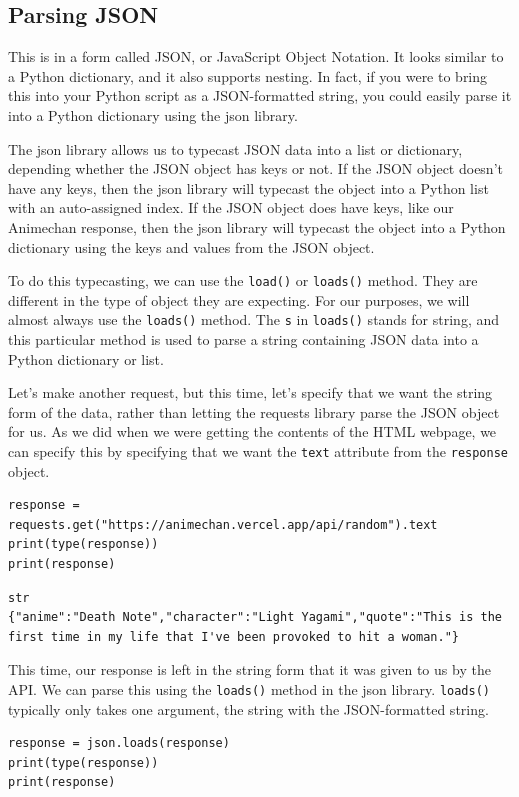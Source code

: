 \subsection{Parsing JSON}
This is in a form called JSON, or JavaScript Object Notation. It looks similar to a Python dictionary, and it also supports nesting. In fact, if you were to bring this into your Python script as a JSON-formatted string, you could easily parse it into a Python dictionary using the json library.\par
The json library allows us to typecast JSON data into a list or dictionary, depending whether the JSON object has keys or not. If the JSON object doesn't have any keys, then the json library will typecast the object into a Python list with an auto-assigned index. If the JSON object does have keys, like our Animechan response, then the json library will typecast the object into a Python dictionary using the keys and values from the JSON object.\par
To do this typecasting, we can use the \verb|load()| or \verb|loads()| method. They are different in the type of object they are expecting. For our purposes, we will almost always use the \verb|loads()| method. The \verb|s| in \verb|loads()| stands for string, and this particular method is used to parse a string containing JSON data into a Python dictionary or list.\par
Let's make another request, but this time, let's specify that we want the string form of the data, rather than letting the requests library parse the JSON object for us. As we did when we were getting the contents of the HTML webpage, we can specify this by specifying that we want the \verb|text| attribute from the \verb|response| object.
\begin{lstlisting}[style=pippython]
response = requests.get("https://animechan.vercel.app/api/random").text
print(type(response))
print(response)
\end{lstlisting}
\begin{lstlisting}[style=none]
str
{"anime":"Death Note","character":"Light Yagami","quote":"This is the first time in my life that I've been provoked to hit a woman."}
\end{lstlisting}
This time, our response is left in the string form that it was given to us by the API. We can parse this using the \verb|loads()| method in the json library. \verb|loads()| typically only takes one argument, the string with the JSON-formatted string.
\begin{lstlisting}[style=pippython]
response = json.loads(response)
print(type(response))
print(response)
\end{lstlisting}
